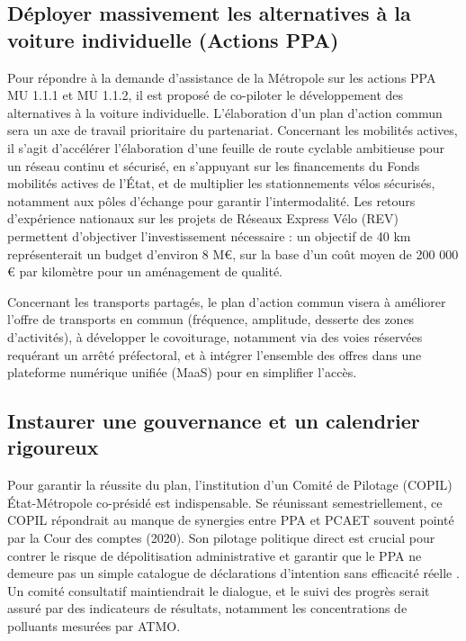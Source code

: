 \documentclass[12pt,a4paper]{article}
\begin{document}
\subsection{Déployer massivement les alternatives à la voiture individuelle (Actions PPA)}

Pour répondre à la demande d'assistance de la Métropole sur les actions PPA MU 1.1.1 et MU 1.1.2, il est proposé de co-piloter le développement des alternatives à la voiture individuelle. L'élaboration d'un plan d'action commun sera un axe de travail prioritaire du partenariat. Concernant les mobilités actives, il s'agit d'accélérer l'élaboration d'une feuille de route cyclable ambitieuse pour un réseau continu et sécurisé, en s'appuyant sur les financements du \og Fonds mobilités actives\fg{} de l'État, et de multiplier les stationnements vélos sécurisés, notamment aux pôles d'échange pour garantir l'intermodalité. Les retours d'expérience nationaux sur les projets de Réseaux Express Vélo (REV) permettent d'objectiver l'investissement nécessaire : un objectif de 40 km représenterait un budget d'environ 8 M€, sur la base d'un coût moyen de 200 000 € par kilomètre pour un aménagement de qualité.

Concernant les transports partagés, le plan d'action commun visera à améliorer l'offre de transports en commun (fréquence, amplitude, desserte des zones d'activités), à développer le covoiturage, notamment via des voies réservées requérant un arrêté préfectoral, et à intégrer l'ensemble des offres dans une plateforme numérique unifiée (MaaS) pour en simplifier l'accès.

\subsection{Instaurer une gouvernance et un calendrier rigoureux}

Pour garantir la réussite du plan, l'institution d'un Comité de Pilotage (COPIL) État-Métropole co-présidé est indispensable. Se réunissant semestriellement, ce COPIL répondrait au manque de synergies entre PPA et PCAET souvent pointé par la Cour des comptes (2020). Son pilotage politique direct est crucial pour contrer le risque de dépolitisation administrative \parencite{boutaric2022art} et garantir que le PPA ne demeure pas un simple catalogue de déclarations d'intention sans efficacité réelle \parencite{boutaric2014}. Un comité consultatif maintiendrait le dialogue, et le suivi des progrès serait assuré par des indicateurs de résultats, notamment les concentrations de polluants mesurées par ATMO.
\end{document}
